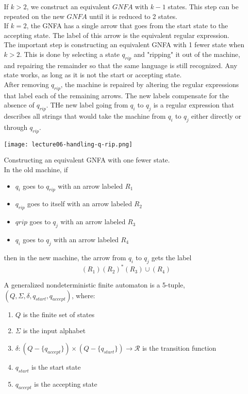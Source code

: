 \documentclass[11pt,a4paper]{article}
\begin{document}
If $k>2$, we construct an equivalent $GNFA$ with $k-1$ states. This step can be repeated on the new $GNFA$ until it is reduced to 2 states. \\

If $k=2$, the GNFA has a single arrow that goes from the start state to the accepting state. The label of this arrow is the equivalent regular expression. \\

The important step is constructing an equivalent GNFA with 1 fewer state when $k>2$.
This is done by selecting a state $q_{rip}$ and "ripping" it out of the machine, and repairing the remainder so that the same language is still recognized.
Any state works, as long as it is not the start or accepting state. \\

After removing $q_{rip}$, the machine is repaired by altering the regular expressions that label each of the remaining arrows.
The new labels compensate for the absence of $q_{rip}$. THe new label going from $q_i$ to $q_j$ is a regular expression that describes all strings that would take the machine from $q_i$ to $q_j$ either directly or through $q_{rip}$.

\texttt{[image: lecture06-handling-q-rip.png]} \\

\begin{example}
    Constructing an equivalent GNFA with one fewer state. \\

    In the old machine, if
    \begin{itemize}
        \item $q_i$ goes to $q_{rip}$ with an arrow labeled $R_1$
        \item $q_{rip}$ goes to itself with an arrow labeled $R_2$
        \item $q{rip}$ goes to $q_j$ with an arrow labeled $R_3$
        \item $q_i$ goes to $q_j$ with an arrow labeled $R_4$
    \end{itemize}
    then in the new machine, the arrow from $q_i$ to $q_j$ gets the label $$(R_1)(R_2)^*(R_3)\cup(R_4)$$
\end{example}

\begin{definition}
    A generalized nondeterministic finite automaton is a 5-tuple, $(Q,\Sigma,\delta, q_{start}, q_{accept})$, where:
    \begin{enumerate}
        \item $Q$ is the finite set of states
        \item $\Sigma$ is the input alphabet
        \item $\delta:(Q-\{q_{accept}\})\times(Q-\{q_{start}\})\rightarrow\mathcal{R}$ is the transition function
        \item $q_{start}$ is the start state
        \item $q_{accept}$ is the accepting state
    \end{enumerate}
\end{definition}
\end{document}
